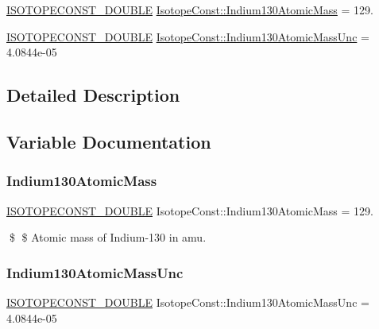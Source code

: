 \begin{DoxyCompactItemize}
\item 
\mbox{\hyperlink{group___isotope_const-_macros_ga8f45a7272ce02c0b4c65c44636ed719a}{I\+S\+O\+T\+O\+P\+E\+C\+O\+N\+S\+T\+\_\+\+D\+O\+U\+B\+LE}} \mbox{\hyperlink{group___isotope_const-_indium-_in130_ga91a2b26c50cd1653fdf3cd0478726d6d}{Isotope\+Const\+::\+Indium130\+Atomic\+Mass}} = 129.
\item 
\mbox{\hyperlink{group___isotope_const-_macros_ga8f45a7272ce02c0b4c65c44636ed719a}{I\+S\+O\+T\+O\+P\+E\+C\+O\+N\+S\+T\+\_\+\+D\+O\+U\+B\+LE}} \mbox{\hyperlink{group___isotope_const-_indium-_in130_ga6a308034a3f1b25cd78227689c586c21}{Isotope\+Const\+::\+Indium130\+Atomic\+Mass\+Unc}} = 4.\+0844e-\/05
\end{DoxyCompactItemize}


\subsection{Detailed Description}


\subsection{Variable Documentation}
\mbox{\label{group___isotope_const-_indium-_in130_ga91a2b26c50cd1653fdf3cd0478726d6d}} 
\subsubsection{\texorpdfstring{Indium130\+Atomic\+Mass}{Indium130AtomicMass}}
{\footnotesize\ttfamily \mbox{\hyperlink{group___isotope_const-_macros_ga8f45a7272ce02c0b4c65c44636ed719a}{I\+S\+O\+T\+O\+P\+E\+C\+O\+N\+S\+T\+\_\+\+D\+O\+U\+B\+LE}} Isotope\+Const\+::\+Indium130\+Atomic\+Mass = 129.}

\$ \$ Atomic mass of Indium-\/130 in amu. \mbox{\label{group___isotope_const-_indium-_in130_ga6a308034a3f1b25cd78227689c586c21}} 
\subsubsection{\texorpdfstring{Indium130\+Atomic\+Mass\+Unc}{Indium130AtomicMassUnc}}
{\footnotesize\ttfamily \mbox{\hyperlink{group___isotope_const-_macros_ga8f45a7272ce02c0b4c65c44636ed719a}{I\+S\+O\+T\+O\+P\+E\+C\+O\+N\+S\+T\+\_\+\+D\+O\+U\+B\+LE}} Isotope\+Const\+::\+Indium130\+Atomic\+Mass\+Unc = 4.\+0844e-\/05}

